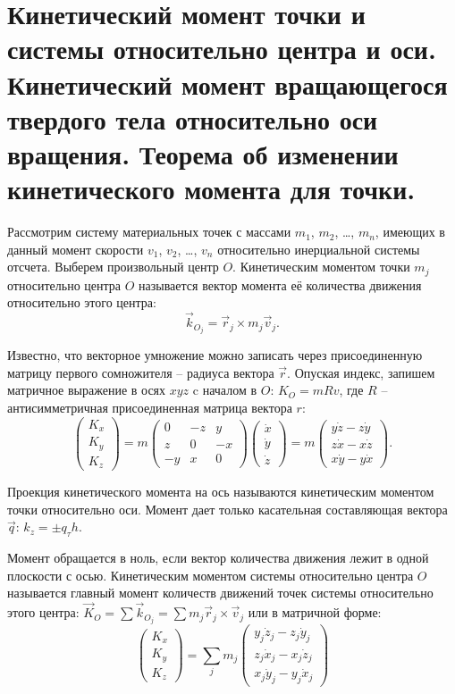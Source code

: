 \chapter{Кинетический момент точки и системы относительно центра и оси.
Кинетический момент вращающегося твердого тела относительно оси вращения.
Теорема об изменении кинетического момента для точки.}

Рассмотрим систему материальных точек с массами \( m_1 \), \( m_2 \), \ldots,
\( m_n \), имеющих в данный момент скорости \( v_1 \), \( v_2 \), \ldots,
\( v_n \) относительно инерциальной системы отсчета. Выберем произвольный центр
\( O \). Кинетическим моментом точки \( m_j \) относительно центра \( O \)
называется вектор момента её количества движения относительно этого центра:
\[
    \vec{k}_{O_j} = \vec{r}_j \times m_j\vec{v}_j.
\]

Известно, что векторное умножение можно записать через присоединенную матрицу
первого сомножителя -- радиуса вектора \( \vec{r} \). Опуская индекс, запишем
матричное выражение в осях \( xyz \) c началом в \( O \): \( K_O = mRv \), где
\( R \) -- антисимметричная присоединенная матрица вектора \( r \):
\[
    \begin{pmatrix} K_x \\ K_y \\ K_z \end{pmatrix} =
    m\begin{pmatrix} 0 & -z & y \\ z & 0 & -x \\ -y & x & 0 \end{pmatrix}
    \begin{pmatrix} \dot{x} \\ \dot{y} \\ \dot{z} \end{pmatrix} = 
    m\begin{pmatrix} y\dot{z} - z\dot{y} \\ z\dot{x} - x\dot{z} \\
    x\dot{y} - y\dot{x} \end{pmatrix}.
\]
 
Проекция кинетического момента на ось называются кинетическим моментом точки
относительно оси. Момент дает только касательная составляющая вектора
\( \vec{q} \): \( k_z = \pm q_\tau h \).

Момент обращается в ноль, если вектор количества движения лежит в одной
плоскости с осью. Кинетическим моментом системы относительно центра \( O \)
называется главный момент количеств движений точек системы относительно этого
центра: \( \vec{K}_O = \sum \vec{k}_{O_j} = \sum m_j \vec{r}_j \times
\vec{v}_j \) или в матричной форме:
\[
    \begin{pmatrix} K_x \\ K_y \\ K_z \end{pmatrix} = \sum_j m_j
    \begin{pmatrix} y_j\dot{z}_j - z_j\dot{y}_j \\ z_j\dot{x}_j - x_j\dot{z}_j
    \\ x_j\dot{y}_j - y_j\dot{x}_j \end{pmatrix}
\]

